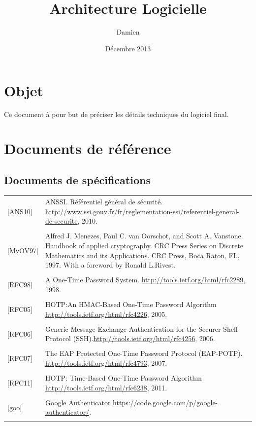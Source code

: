 \documentclass{"../../res/univ-projet"}
\title{Architecture Logicielle}
\author{\bsc{Picard} Damien}
\date{Décembre 2013}
\begin{document}
\maketitle
\section{Objet}
Ce document à pour but de préciser les détails techniques du logiciel final.

\section{Documents de référence}
\subsection{Documents de spécifications}
\begin{tabular}{p{}>{\raggedright\arraybackslash}p{13cm}}
    {[ANS10]} & {ANSSI. Référentiel général de sécurité. \href{http://www.ssi.gouv.fr/fr/reglementation-ssi/referentiel-general-de-securite}{http://www.ssi.gouv.fr/fr/reglementation-ssi/referentiel-general-de-securite}, 2010.}
    \tabularnewline
    \\
    {[MvOV97]} & {Alfred J. Menezes, Paul C. van Oorschot, and Scott A. Vanstone. Handbook of applied cryptography. CRC Press Series on Discrete Mathematics and its Applications. CRC Press, Boca Raton, FL, 1997. With a foreword by Ronald L.Rivest.}
    \tabularnewline
    \\
    {[RFC98]} & {A One-Time Password System. \href{http://tools.ietf.org/html/rfc2289}{http://tools.ietf.org/html/rfc2289}, 1998.}
    \tabularnewline
    \\
    {[RFC05]} & {HOTP:An HMAC-Based One-Time Password Algorithm \href{http://tools.ietf.org/html/rfc4226}{http://tools.ietf.org/html/rfc4226}, 2005.}
    \tabularnewline
    \\
    {[RFC06]} & {Generic Message Exchange Authentication for the Securer Shell Protocol (SSH).\href{http://tools.ietf.org/html/rfc4256}{http://tools.ietf.org/html/rfc4256}, 2006.}
    \tabularnewline
    \\
    {[RFC07]} & {The EAP Protected One-Time Password Protocol (EAP-POTP). \href{http://tools.ietf.org/html/rfc4793}{http://tools.ietf.org/html/rfc4793}, 2007.}
    \tabularnewline
    \\
    {[RFC11]} & {HOTP: Time-Based One-Time Password Algorithm \href{http://tools.ietf.org/html/rfc6238}{http://tools.ietf.org/html/rfc6238}, 2011.}
    \tabularnewline
    \\
    {[goo]} & {Google Authenticator \href{https://code.google.com/p/google-authenticator/}{https://code.google.com/p/google-authenticator/}.}
    \tabularnewline
    \\
\end{tabular}
\end{document}
